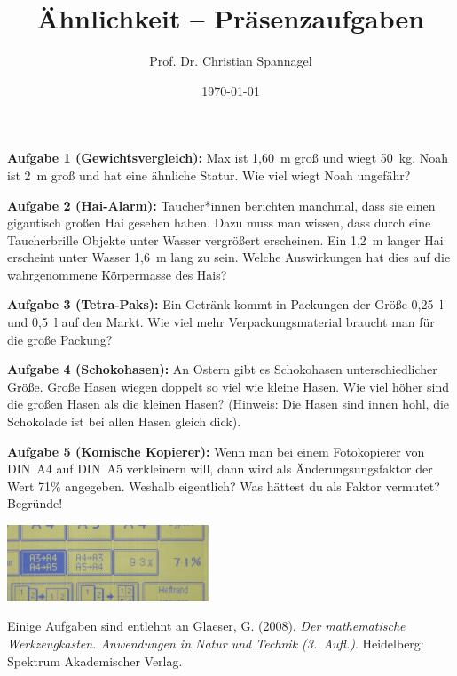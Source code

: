 \documentclass{../cssheet}
\title{Ähnlichkeit -- Präsenzaufgaben}
\author{Prof. Dr. Christian Spannagel}
\date{\today}
\begin{document}
\printtitle

\vspace*{5mm}

\textbf{Aufgabe 1 (Gewichtsvergleich):}  Max ist 1,60~m groß und wiegt 50~kg. Noah ist 2~m groß und hat eine ähnliche Statur. Wie viel wiegt Noah ungefähr?


\textbf{Aufgabe 2 (Hai-Alarm):}  Taucher*innen berichten manchmal, dass sie einen gigantisch großen Hai gesehen haben. Dazu muss man wissen, dass durch eine Taucherbrille Objekte unter Wasser vergrößert erscheinen. Ein 1,2~m langer Hai erscheint unter Wasser 1,6~m lang zu sein. Welche Auswirkungen hat dies auf die wahrgenommene Körpermasse des Hais?

\textbf{Aufgabe 3 (Tetra-Paks):} Ein Getränk kommt in Packungen der Größe 0,25~l und 0,5~l auf den Markt. Wie viel mehr Verpackungsmaterial braucht man für die große Packung?

\textbf{Aufgabe 4 (Schokohasen):} An Ostern gibt es Schokohasen unterschiedlicher Größe. Große Hasen wiegen doppelt so viel wie kleine  Hasen. Wie viel höher sind die großen Hasen als die kleinen Hasen? (Hinweis: Die Hasen sind innen hohl, die Schokolade ist bei allen Hasen gleich dick).

\textbf{Aufgabe 5 (Komische Kopierer):} Wenn man bei einem Fotokopierer von DIN~A4 auf DIN~A5 verkleinern will, dann wird als
Änderungsungsfaktor der Wert 71\% angegeben. Weshalb eigentlich? Was hättest du als Faktor vermutet? Begründe!
\begin{center}
\includegraphics[width=6cm]{kopierer.png}
\end{center}

Einige Aufgaben sind entlehnt an Glaeser, G. (2008). \emph{Der mathematische Werkzeugkasten. Anwendungen in Natur und Technik (3.~Aufl.)}. Heidelberg: Spektrum Akademischer Verlag.

\vspace*{10mm}
\printlicense

\printsocials
\end{document}
